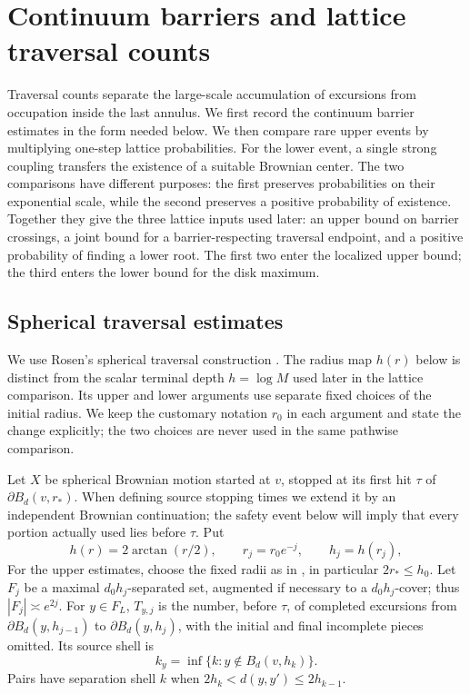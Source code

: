\section{Continuum barriers and lattice traversal counts}
\label{sec:continuum-transfer}

Traversal counts separate the large-scale accumulation of excursions from
occupation inside the last annulus.  We first record the continuum barrier
estimates in the form needed below.  We then compare rare upper events by
multiplying one-step lattice probabilities.  For the lower event, a single
strong coupling transfers the existence of a suitable Brownian center.
The two comparisons have different purposes: the first preserves probabilities
on their exponential scale, while the second preserves a positive probability
of existence.
Together they give the three lattice inputs used later: an upper bound on
barrier crossings, a joint bound for a barrier-respecting traversal endpoint,
and a positive probability of finding a lower root.  The first two enter the
localized upper bound; the third enters the lower bound for the disk maximum.

\subsection{Spherical traversal estimates}

We use Rosen's spherical traversal construction \cite{Rosen2022}.
The radius map $h(r)$ below is distinct from the scalar terminal depth
$h=\log M$ used later in the lattice comparison.
Its upper and lower arguments use separate fixed choices of the initial
radius.  We keep the customary notation $r_0$ in each argument and state
the change explicitly; the two choices are never used in the same pathwise
comparison.

Let $X$ be spherical Brownian motion started at $v$, stopped at its
first hit $\tau$ of $\partial B_d(v,r_*)$.  When defining source
stopping times we extend it by an independent Brownian continuation;
the safety event below will imply that every portion actually used lies
before $\tau$.  Put
\begin{equation}
h(r)=2\arctan(r/2),\qquad r_j=r_0e^{-j},\qquad h_j=h(r_j),\label{eq:ct-external-23}
\end{equation}
For the upper estimates, choose the fixed radii as in
\cite[Section~2, (2.2)]{Rosen2022}, in particular $2r_*\le h_0$.  Let $F_j$ be a
maximal $d_0h_j$-separated set, augmented if necessary to a
$d_0h_j$-cover; thus $|F_j|\asymp e^{2j}$.  For $y\in F_L$,
$T_{y,j}$ is the number, before $\tau$, of completed excursions from
$\partial B_d(y,h_{j-1})$ to $\partial B_d(y,h_j)$, with the initial
and final incomplete pieces omitted.  Its source shell is
\begin{equation}
k_y=\inf\{k:y\notin B_d(v,h_k)\}.\label{eq:ct-external-24}
\end{equation}
Pairs have separation shell $k$ when
$2h_k<d(y,y')\le2h_{k-1}$.


